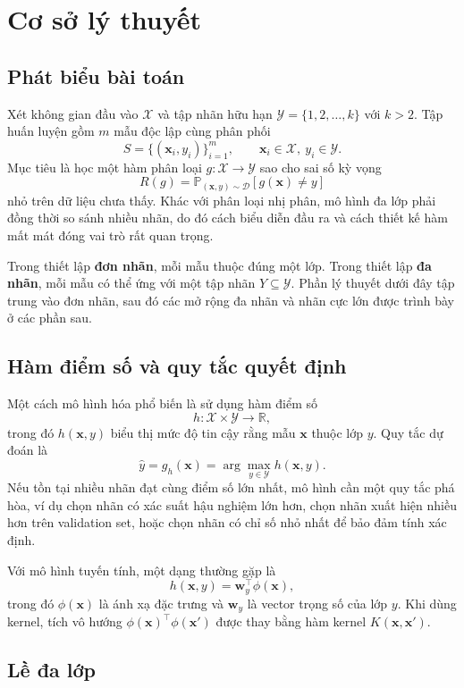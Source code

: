 \section{Cơ sở lý thuyết}

\subsection{Phát biểu bài toán}

Xét không gian đầu vào $\mathcal{X}$ và tập nhãn hữu hạn $\mathcal{Y}=\{1,2,\ldots,k\}$ với $k>2$. Tập huấn luyện gồm $m$ mẫu độc lập cùng phân phối
\[
  S=\{(\bm{x}_i,y_i)\}_{i=1}^{m},\qquad \bm{x}_i\in\mathcal{X},\ y_i\in\mathcal{Y}.
\]
Mục tiêu là học một hàm phân loại $g:\mathcal{X}\to\mathcal{Y}$ sao cho sai số kỳ vọng
\[
  R(g)=\mathbb{P}_{(\bm{x},y)\sim\mathcal{D}}[g(\bm{x})\neq y]
\]
nhỏ trên dữ liệu chưa thấy. Khác với phân loại nhị phân, mô hình đa lớp phải đồng thời so sánh nhiều nhãn, do đó cách biểu diễn đầu ra và cách thiết kế hàm mất mát đóng vai trò rất quan trọng.

Trong thiết lập \textbf{đơn nhãn}, mỗi mẫu thuộc đúng một lớp. Trong thiết lập \textbf{đa nhãn}, mỗi mẫu có thể ứng với một tập nhãn $Y\subseteq\mathcal{Y}$. Phần lý thuyết dưới đây tập trung vào đơn nhãn, sau đó các mở rộng đa nhãn và nhãn cực lớn được trình bày ở các phần sau.

\subsection{Hàm điểm số và quy tắc quyết định}

Một cách mô hình hóa phổ biến là sử dụng hàm điểm số
\[
  h: \mathcal{X}\times\mathcal{Y}\to\mathbb{R},
\]
trong đó $h(\bm{x},y)$ biểu thị mức độ tin cậy rằng mẫu $\bm{x}$ thuộc lớp $y$. Quy tắc dự đoán là
\[
  \hat{y}=g_h(\bm{x})=\arg\max_{y\in\mathcal{Y}} h(\bm{x},y).
\]
Nếu tồn tại nhiều nhãn đạt cùng điểm số lớn nhất, mô hình cần một quy tắc phá hòa, ví dụ chọn nhãn có xác suất hậu nghiệm lớn hơn, chọn nhãn xuất hiện nhiều hơn trên validation set, hoặc chọn nhãn có chỉ số nhỏ nhất để bảo đảm tính xác định.

Với mô hình tuyến tính, một dạng thường gặp là
\[
  h(\bm{x},y)=\bm{w}_y^\top\phi(\bm{x}),
\]
trong đó $\phi(\bm{x})$ là ánh xạ đặc trưng và $\bm{w}_y$ là vector trọng số của lớp $y$. Khi dùng kernel, tích vô hướng $\phi(\bm{x})^\top\phi(\bm{x}')$ được thay bằng hàm kernel $K(\bm{x},\bm{x}')$.


\subsection{Lề đa lớp}

